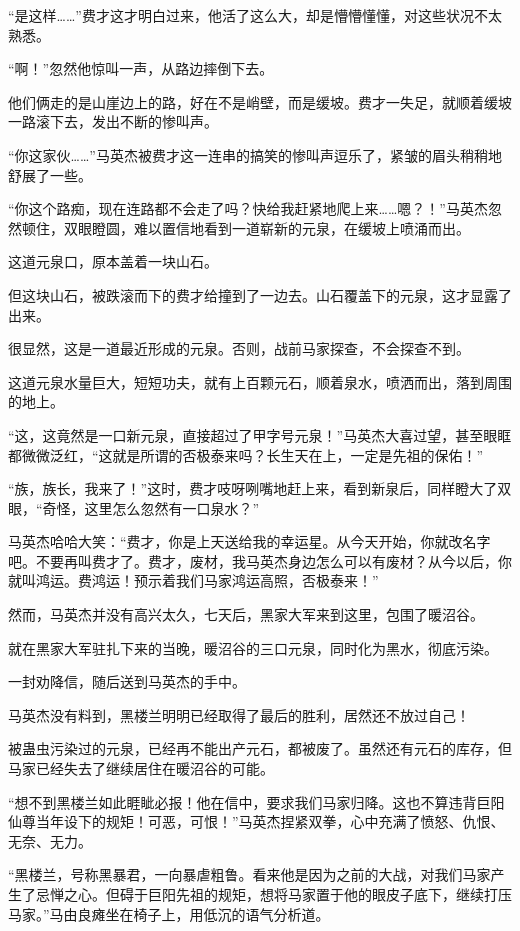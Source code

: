 \begin{this_body}
“是这样……”费才这才明白过来，他活了这么大，却是懵懵懂懂，对这些状况不太熟悉。

“啊！”忽然他惊叫一声，从路边摔倒下去。

他们俩走的是山崖边上的路，好在不是峭壁，而是缓坡。费才一失足，就顺着缓坡一路滚下去，发出不断的惨叫声。

“你这家伙……”马英杰被费才这一连串的搞笑的惨叫声逗乐了，紧皱的眉头稍稍地舒展了一些。

“你这个路痴，现在连路都不会走了吗？快给我赶紧地爬上来……嗯？！”马英杰忽然顿住，双眼瞪圆，难以置信地看到一道崭新的元泉，在缓坡上喷涌而出。

这道元泉口，原本盖着一块山石。

但这块山石，被跌滚而下的费才给撞到了一边去。山石覆盖下的元泉，这才显露了出来。

很显然，这是一道最近形成的元泉。否则，战前马家探查，不会探查不到。

这道元泉水量巨大，短短功夫，就有上百颗元石，顺着泉水，喷洒而出，落到周围的地上。

“这，这竟然是一口新元泉，直接超过了甲字号元泉！”马英杰大喜过望，甚至眼眶都微微泛红，“这就是所谓的否极泰来吗？长生天在上，一定是先祖的保佑！”

“族，族长，我来了！”这时，费才吱呀咧嘴地赶上来，看到新泉后，同样瞪大了双眼，“奇怪，这里怎么忽然有一口泉水？”

马英杰哈哈大笑：“费才，你是上天送给我的幸运星。从今天开始，你就改名字吧。不要再叫费才了。费才，废材，我马英杰身边怎么可以有废材？从今以后，你就叫鸿运。费鸿运！预示着我们马家鸿运高照，否极泰来！”

然而，马英杰并没有高兴太久，七天后，黑家大军来到这里，包围了暖沼谷。

就在黑家大军驻扎下来的当晚，暖沼谷的三口元泉，同时化为黑水，彻底污染。

一封劝降信，随后送到马英杰的手中。

马英杰没有料到，黑楼兰明明已经取得了最后的胜利，居然还不放过自己！

被蛊虫污染过的元泉，已经再不能出产元石，都被废了。虽然还有元石的库存，但马家已经失去了继续居住在暖沼谷的可能。

“想不到黑楼兰如此睚眦必报！他在信中，要求我们马家归降。这也不算违背巨阳仙尊当年设下的规矩！可恶，可恨！”马英杰捏紧双拳，心中充满了愤怒、仇恨、无奈、无力。

“黑楼兰，号称黑暴君，一向暴虐粗鲁。看来他是因为之前的大战，对我们马家产生了忌惮之心。但碍于巨阳先祖的规矩，想将马家置于他的眼皮子底下，继续打压马家。”马由良瘫坐在椅子上，用低沉的语气分析道。


\end{this_body}
